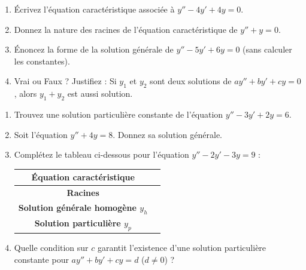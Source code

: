 \documentclass[11pt]{article}
\begin{document}
\begin{exercice}[Équation homogène du second ordre : $ay''+by'+cy=0$]
\begin{enumerate}
    \item Écrivez l'équation caractéristique associée à $y'' - 4y' + 4y = 0$.
    \item Donnez la nature des racines de l'équation caractéristique de $y'' + y = 0$.
    \item Énoncez la forme de la solution générale de $y'' - 5y' + 6y = 0$ (sans calculer les constantes).
    \item Vrai ou Faux ? Justifiez : Si $y_1$ et $y_2$ sont deux solutions de $ay''+by'+cy=0$, alors $y_1 + y_2$ est aussi solution.
\end{enumerate}
\end{exercice}

\begin{exercice}[Équation non homogène : $ay''+by'+cy=d$]
\begin{enumerate}
    \item Trouvez une solution particulière constante de l'équation $y'' - 3y' + 2y = 6$.
    \item Soit l'équation $y'' + 4y = 8$. Donnez sa solution générale.
    \item Complétez le tableau ci-dessous pour l'équation $y'' - 2y' - 3y = 9$ :
    \begin{center}
    \begin{tabular}{|c|c|}
    \hline
    \textbf{Équation caractéristique} & \underline{\hspace{3cm}} \\
    \hline
    \textbf{Racines} & \underline{\hspace{3cm}} \\
    \hline
    \textbf{Solution générale homogène $y_h$} & \underline{\hspace{3cm}} \\
    \hline
    \textbf{Solution particulière $y_p$} & \underline{\hspace{3cm}} \\
    \hline
    \end{tabular}
    \end{center}
    \item Quelle condition sur $c$ garantit l'existence d'une solution particulière constante pour $ay''+by'+cy=d$ ($d \neq 0$) ?
\end{enumerate}
\end{exercice}
\end{document}
